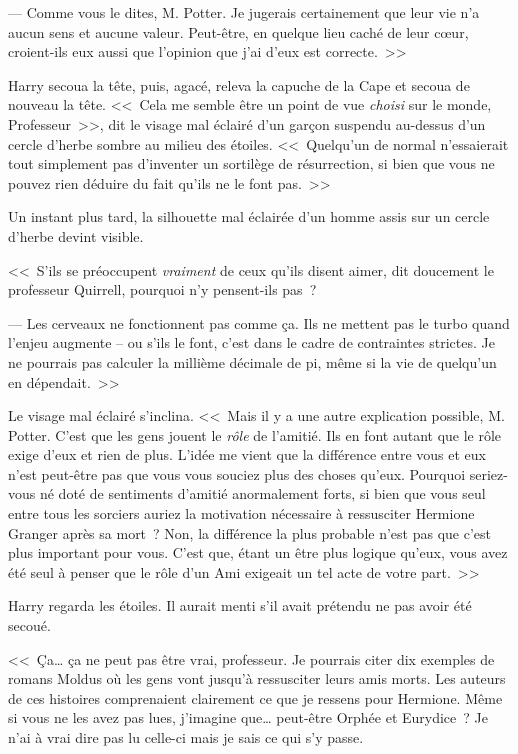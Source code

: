--- Comme vous le dites, M. Potter. Je jugerais certainement que leur vie n'a aucun sens et aucune valeur. Peut-être, en quelque lieu caché de leur cœur, croient-ils eux aussi que l'opinion que j'ai d'eux est correcte.~>>

Harry secoua la tête, puis, agacé, releva la capuche de la Cape et secoua de nouveau la tête. <<~Cela me semble être un point de vue \emph{choisi} sur le monde, Professeur~>>, dit le visage mal éclairé d'un garçon suspendu au-dessus d'un cercle d'herbe sombre au milieu des étoiles. <<~Quelqu'un de normal n'essaierait tout simplement pas d'inventer un sortilège de résurrection, si bien que vous ne pouvez rien déduire du fait qu'ils ne le font pas.~>>

Un instant plus tard, la silhouette mal éclairée d'un homme assis sur un cercle d'herbe devint visible.

<<~S'ils se préoccupent \emph{vraiment} de ceux qu'ils disent aimer, dit doucement le professeur Quirrell, pourquoi n'y pensent-ils pas~?

--- Les cerveaux ne fonctionnent pas comme ça. Ils ne mettent pas le turbo quand l'enjeu augmente -- ou s'ils le font, c'est dans le cadre de contraintes strictes. Je ne pourrais pas calculer la millième décimale de pi, même si la vie de quelqu'un en dépendait.~>>

Le visage mal éclairé s'inclina. <<~Mais il y a une autre explication possible, M. Potter. C'est que les gens jouent le \emph{rôle} de l'amitié. Ils en font autant que le rôle exige d'eux et rien de plus. L'idée me vient que la différence entre vous et eux n'est peut-être pas que vous vous souciez plus des choses qu'eux. Pourquoi seriez-vous né doté de sentiments d'amitié anormalement forts, si bien que vous seul entre tous les sorciers auriez la motivation nécessaire à ressusciter Hermione Granger après sa mort~? Non, la différence la plus probable n'est pas que c'est plus important pour vous. C'est que, étant un être plus logique qu'eux, vous avez été seul à penser que le rôle d'un Ami exigeait un tel acte de votre part.~>>

Harry regarda les étoiles. Il aurait menti s'il avait prétendu ne pas avoir été secoué.

<<~Ça… ça ne peut pas être vrai, professeur. Je pourrais citer dix exemples de romans Moldus où les gens vont jusqu'à ressusciter leurs amis morts. Les auteurs de ces histoires comprenaient clairement ce que je ressens pour Hermione. Même si vous ne les avez pas lues, j'imagine que… peut-être Orphée et Eurydice~? Je n'ai à vrai dire pas lu celle-ci mais je sais ce qui s'y passe.


